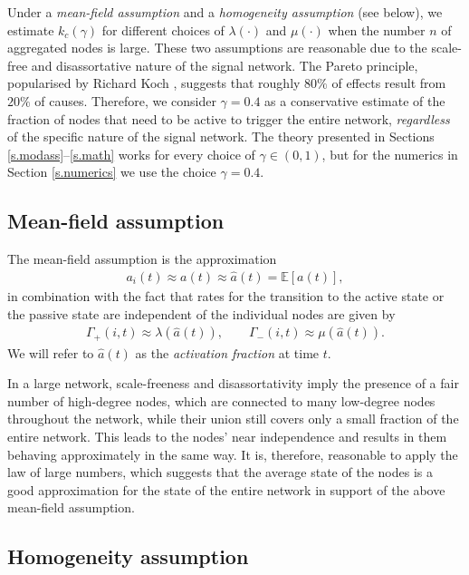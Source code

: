 \documentclass[11pt]{article}
\numberwithin{equation}{section}
\newcommand{\E}{\mathbb{E}}
\begin{document}
Under a {\em mean-field assumption} and a {\em homogeneity assumption} (see below), we estimate $k_c(\gamma)$ for different choices of $\lambda(\cdot)$ and $\mu(\cdot)$ when the number $n$ of aggregated nodes is large. These two assumptions are reasonable due to the scale-free and disassortative nature of the signal network. The Pareto principle, popularised by Richard Koch \cite{Koch}, suggests that roughly $80\%$ of effects result from $20\%$ of causes. Therefore, we consider $\gamma = 0.4$ as a conservative estimate of the fraction of nodes that need to be active to trigger the entire network, \emph{regardless} of the specific nature of the signal network. The theory presented in Sections \ref{s.modass}--\ref{s.math} works for every choice of $\gamma \in (0,1)$, but for the numerics in Section \ref{s.numerics} we use the choice $\gamma = 0.4$.


\subsection{Mean-field assumption}
\label{ss.MF} 

The mean-field assumption is the approximation
\begin{align*}
a_{i}(t) \approx a(t) \approx \hat{a}(t)=\E[a(t)],
\end{align*}
in combination with the fact that rates for the transition to the active state or the passive state are independent of the individual nodes are given by
\begin{align*}
\Gamma_{+}(i,t) \approx \lambda(\hat{a}(t)), \qquad  \Gamma_{-}(i,t)\approx\mu(\hat{a}(t)).
\end{align*} 
We will refer to $\hat{a}(t)$ as the \emph{activation fraction} at time $t$.

In a large network, scale-freeness and disassortativity imply the presence of a fair number of high-degree nodes, which are connected to many low-degree nodes throughout the network, while their union still covers only a small fraction of the entire network. This leads to the nodes' near independence and results in them behaving approximately in the same way. It is, therefore, reasonable to apply the law of large numbers, which suggests that the average state of the nodes is a good approximation for the state of the entire network in support of the above mean-field assumption. 


\subsection{Homogeneity assumption}
\label{ss.H} 
\end{document}
